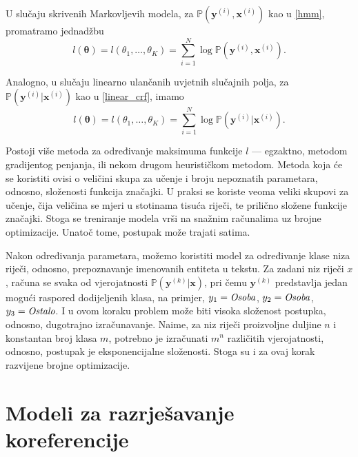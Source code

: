 \documentclass[a4paper,twoside,12pt]{memoir} %
\newcommand{\ti}[1]{\textit{#1\/}}
\begin{document}
	U slučaju skrivenih Markovljevih modela, za $\mathbb{P}(\mathbf{y}^{(i)}, \mathbf{x}^{(i)})$ kao u \eqref{hmm}, promatramo jednadžbu
	\begin{equation*}
	l(\bm{\theta}) = l(\theta_1, \ldots, \theta_K) = \sum_{i=1}^{N} \log \mathbb{P}(\mathbf{y}^{(i)}, \mathbf{x}^{(i)}).
	\end{equation*}

	Analogno, u slučaju linearno ulančanih uvjetnih slučajnih polja, za  $\mathbb{P}(\mathbf{y}^{(i)} | \mathbf{x}^{(i)})$ kao u \eqref{linear_crf}, imamo
	\begin{equation*}
	l(\bm{\theta}) = l(\theta_1, \ldots, \theta_K) = \sum_{i=1}^{N} \log \mathbb{P}(\mathbf{y}^{(i)} | \mathbf{x}^{(i)}).
	\end{equation*}

	Postoji više metoda za određivanje maksimuma funkcije $l$ --- egzaktno, metodom gradijentog penjanja, ili nekom drugom heurističkom metodom. Metoda koja će se koristiti ovisi o veličini skupa za učenje i broju nepoznatih parametara, odnosno, složenosti funkcija značajki. U praksi se koriste veoma veliki skupovi za učenje, čija veličina se mjeri u stotinama tisuća riječi, te prilično složene funkcije značajki. Stoga se treniranje modela vrši na snažnim računalima uz brojne optimizacije. Unatoč tome, postupak može trajati satima.

	\bigskip

	Nakon određivanja parametara, možemo koristiti model za određivanje klase niza riječi, odnosno, prepoznavanje imenovanih entiteta u tekstu. Za zadani niz riječi $x$, računa se svaka od vjerojatnosti $\mathbb{P}(\mathbf{y}^{(k)} | \mathbf{x})$, pri čemu $\mathbf{y}^{(k)}$ predstavlja jedan mogući raspored dodijeljenih klasa, na primjer, $y_1 = \ti{Osoba}$, $y_2 = \ti{Osoba}$, $y_3 = \ti{Ostalo}$. I u ovom koraku problem može biti visoka složenost postupka, odnosno, dugotrajno izračunavanje. Naime, za niz riječi proizvoljne duljine $n$ i konstantan broj klasa $m$, potrebno je izračunati $m^n$ različitih vjerojatnosti, odnosno, postupak je eksponencijalne složenosti. Stoga su i za ovaj korak razvijene brojne optimizacije.


	\chapter{Modeli za razrješavanje koreferencije}

\end{document}
